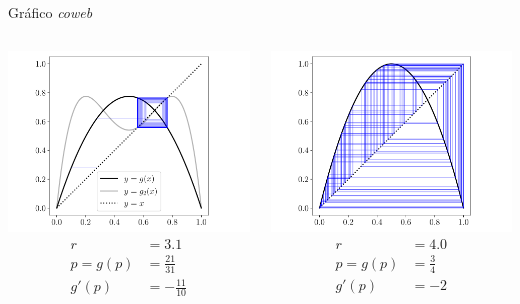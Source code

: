 \documentclass[9pt, aspectratio=169]{beamer}
\begin{document}
\begin{frame}{Gráfico \textit{coweb}}
\begin{columns}
		\begin{center}
			\includegraphics[scale=0.35]{figs/coweb-02.pdf}
			\begin{align*}
				r        & = 3.1            \\
				p = g(p) & = \frac{21}{31}  \\
				g'(p)    & = -\frac{11}{10}
			\end{align*}
		\end{center} \pause

		\begin{center}
			\includegraphics[scale=0.35]{figs/coweb-03.pdf}
			\begin{align*}
				r        & = 4.0         \\
				p = g(p) & = \frac{3}{4} \\
				g'(p)    & = -2
			\end{align*}
		\end{center}
	\end{columns}
\end{frame}
\end{document}
